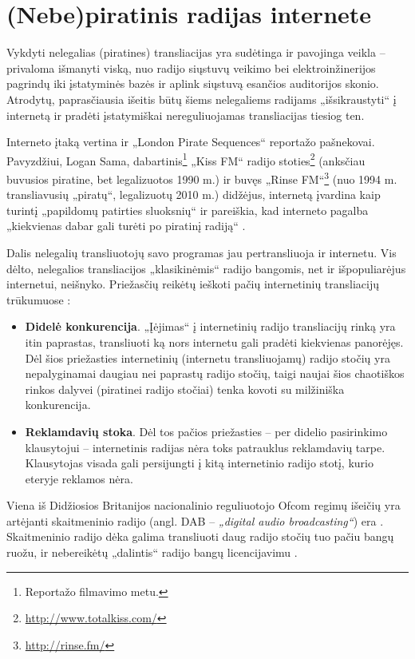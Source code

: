 \documentclass[kursinis-darbas]{vukf}
\begin{document}
\section{(Nebe)piratinis radijas internete}

Vykdyti nelegalias (piratines) transliacijas yra sudėtinga ir pavojinga veikla – privaloma išmanyti viską, nuo radijo siųstuvų veikimo bei elektroinžinerijos pagrindų iki įstatyminės bazės ir aplink siųstuvą esančios auditorijos skonio. Atrodytų, paprasčiausia išeitis būtų šiems nelegaliems radijams „išsikraustyti“ į internetą ir pradėti įstatymiškai nereguliuojamas transliacijas tiesiog ten.

Interneto įtaką vertina ir „London Pirate Sequences“ reportažo pašnekovai. Pavyzdžiui, Logan Sama, dabartinis\footnote{Reportažo filmavimo metu.} „Kiss FM“ radijo stoties\footnote{\url{http://www.totalkiss.com/}} (anksčiau buvusios piratine, bet legalizuotos 1990 m.) ir buvęs „Rinse FM“\footnote{\url{http://rinse.fm/}} (nuo 1994 m. transliavusių „piratų“, legalizuotų 2010 m.) didžėjus, internetą įvardina kaip turintį „papildomų patirties sluoksnių“ ir pareiškia, kad interneto pagalba „kiekvienas dabar gali turėti po piratinį radiją“ \cite{vice_london_pirate_sequences}.

Dalis nelegalių transliuotojų savo programas jau pertransliuoja ir internetu. Vis dėlto, nelegalios transliacijos „klasikinėmis“ radijo bangomis, net ir išpopuliarėjus internetui, neišnyko. Priežasčių reikėtų ieškoti pačių internetinių transliacijų trūkumuose \cite[p.~758]{chs_encyclopedia_of_radio}:

\begin{itemize}
	\item \textbf{Didelė konkurencija}. „Įėjimas“ į internetinių radijo transliacijų rinką yra itin paprastas, transliuoti ką nors internetu gali pradėti kiekvienas panorėjęs. Dėl šios priežasties internetinių (internetu transliuojamų) radijo stočių yra nepalyginamai daugiau nei paprastų radijo stočių, taigi naujai šios chaotiškos rinkos dalyvei (piratinei radijo stočiai) tenka kovoti su milžiniška konkurencija.
	\item \textbf{Reklamdavių stoka}. Dėl tos pačios priežasties – per didelio pasirinkimo klausytojui – internetinis radijas nėra toks patrauklus reklamdavių tarpe. Klausytojas visada gali persijungti į kitą internetinio radijo stotį, kurio eteryje reklamos nėra.
\end{itemize}

Viena iš Didžiosios Britanijos nacionalinio reguliuotojo \gls{Ofcom} regimų išeičių yra artėjanti skaitmeninio radijo (angl. DAB – \emph{„digital audio broadcasting“}) era \cite{bbc_radio_4_do_pirates_rule_the_air_waves}. Skaitmeninio radijo dėka galima transliuoti daug radijo stočių tuo pačiu bangų ruožu, ir nebereikėtų „dalintis“ radijo bangų licencijavimu \cite{worlddab}.
\end{document}
